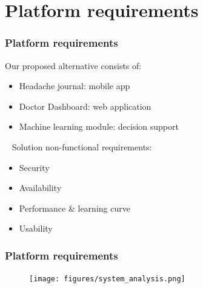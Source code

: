 \documentclass[english]{beamer}
\begin{document}
\section{Platform requirements}
\label{sec:platform_req}
\begin{frame}
	\frametitle{Platform requirements}


		Our proposed alternative consists of:
		\begin{itemize}
			\item Headache journal: mobile app
			\item Doctor Dashboard: web application
			\item Machine learning module: decision support
		\end{itemize}
		\ \newline
		Solution non-functional requirements:
		\begin{itemize}
			\item Security
			\item Availability
			\item Performance \& learning curve
			\item Usability
		\end{itemize}
\end{frame}
\begin{frame}
		\frametitle{Platform requirements}
		\begin{figure}[!h]
			\texttt{[image: figures/system\_analysis.png]}
		\end{figure}	
	
\end{frame}
\end{document}

